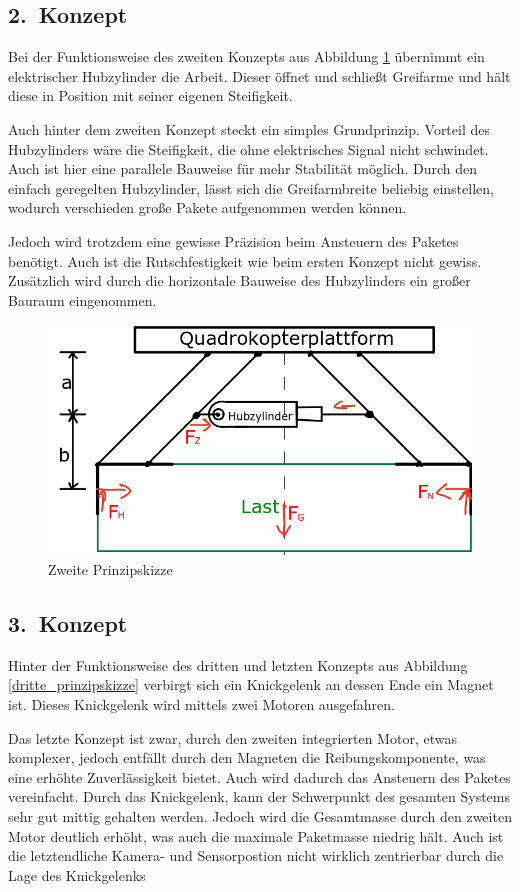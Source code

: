 \newpage
\subsection{2.~Konzept}
Bei der Funktionsweise des zweiten Konzepts aus Abbildung \ref{zweite_prinzipskizze} übernimmt ein elektrischer Hubzylinder die Arbeit. Dieser öffnet und schließt Greifarme und hält diese in Position mit seiner eigenen Steifigkeit.
\par
Auch hinter dem zweiten Konzept steckt ein simples Grundprinzip. Vorteil des Hubzylinders wäre die Steifigkeit, die ohne elektrisches Signal nicht schwindet. Auch ist hier eine parallele Bauweise für mehr Stabilität möglich. Durch den einfach geregelten Hubzylinder, lässt sich die Greifarmbreite beliebig einstellen, wodurch verschieden große Pakete aufgenommen werden können.
\par
Jedoch wird trotzdem eine gewisse Präzision beim Ansteuern des Paketes benötigt. Auch ist die Rutschfestigkeit wie beim ersten Konzept nicht gewiss. Zusätzlich wird durch die horizontale Bauweise des Hubzylinders ein großer Bauraum eingenommen.
\begin{figure}[h]
	\begin{center}
	\includegraphics[scale=0.7]{"Grafiken/Skizze2mechanik.png"}
	\caption{Zweite Prinzipskizze}
	\label{zweite_prinzipskizze}
	\end{center}
\end{figure}
\newpage
\subsection{3.~Konzept}
Hinter der Funktionsweise des dritten und letzten Konzepts aus Abbildung \ref{dritte_prinzipskizze} verbirgt sich ein Knickgelenk an dessen Ende ein Magnet ist. Dieses Knickgelenk wird mittels zwei Motoren ausgefahren.
\par
Das letzte Konzept ist zwar, durch den zweiten integrierten Motor, etwas komplexer, jedoch entfällt durch den Magneten die Reibungskomponente, was eine erhöhte Zuverlässigkeit bietet. Auch wird dadurch das Ansteuern des Paketes vereinfacht. Durch das Knickgelenk, kann der Schwerpunkt des gesamten Systems sehr gut mittig gehalten werden.
Jedoch wird die Gesamtmasse durch den zweiten Motor deutlich erhöht, was auch die maximale Paketmasse niedrig hält. Auch ist die letztendliche Kamera- und Sensorpostion nicht wirklich zentrierbar durch die Lage des Knickgelenks

